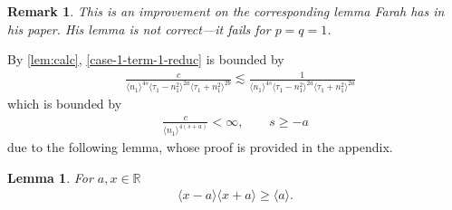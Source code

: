 \documentclass[12pt,reqno]{amsart}
\numberwithin{equation}{section}  %
\newcommand{\rr}{\mathbb{R}}
\newtheorem{lemma}[theorem]{Lemma}
\newtheorem{remark}[theorem]{Remark}
\begin{document}
\begin{framed}
  \begin{remark}
  \label{rem:farah-wrong}
  This is an improvement on the corresponding lemma Farah has in his paper. His
  lemma is not correct---it fails for $p=q=1$.
  \end{remark}
\end{framed}
%
By \cref{lem:calc}, \eqref{case-1-term-1-reduc} is bounded by
%
%
\begin{equation*}
\begin{split}
  & \frac{c}{\langle n_{1} \rangle ^{4s} \langle \tau_{1} - n_{1}^{2} \rangle
  ^{2a}
  \langle \tau_{1} + n_{1}^{2} \rangle^{2b}
  } \lesssim
  \frac{1}{\langle n_{1} \rangle ^{4s} \langle \tau_{1} - n_{1}^{2} \rangle^{2a}
\langle \tau_{1} + n_{1}^{2} \rangle^{2a}
  }
\end{split}
\end{equation*}
%
%
%
%
which is bounded by
%
%
%
\begin{equation*}
\begin{split}
  \frac{c}{\langle n_{1} \rangle^{4(s + a)}} < \infty, \qquad s \ge -a
\end{split}
\end{equation*}
due to the following lemma, whose proof is provided in the appendix.
%
%
%
%
%
%
%
%
%
\begin{lemma}
\label{lem:calc-lower-bound}
For $ a, x \in \rr$
\begin{equation}
  \label{simp-est-lower-bound}
\begin{split}
\langle x-a \rangle \langle x+a \rangle  \ge \langle a \rangle.
\end{split}
\end{equation}
\end{lemma}
%
%
%
%
%
\end{document}
